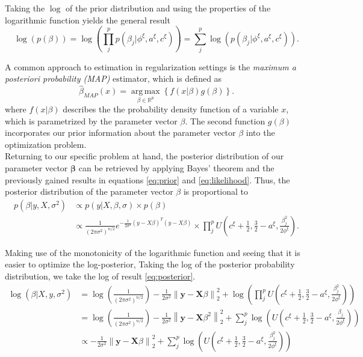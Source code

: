 \documentclass[12pt,a4paper]{article}
\newcommand{\norm}[1]{\left\lVert#1\right\rVert}
\DeclareMathOperator*{\argmax}{arg\,max}
\begin{document}
Taking the $\log$ of the prior distribution and using the properties of the logarithmic function yields the general result
\[
\log(p(\beta))=\log(\prod_j^p p(\beta_j|\phi^\xi, a^\xi, c^\xi))=\sum_j^p \log(p(\beta_j|\phi^\xi, a^\xi, c^\xi)).
\]

A common approach to estimation in regularization settings is the \textit{maximum a posteriori probability (MAP)} estimator, which is defined as
\[
\hat{\beta}_{MAP}(x) = \underset{\beta \in \mathbb{R}^p}{\argmax}\left\{f(x|\beta)g(\beta)\right\}.
\]
where $f(x|\beta)$ describes the the probability density function of a variable $x$, which is parametrized by the parameter vector $\beta$. The second function $g(\beta)$ incorporates our prior information about the parameter vector $\beta$ into the optimization problem.\\  

Returning to our specific problem at hand, the posterior distribution of our parameter vector $\mathbf{\beta}$ can be retrieved by applying Bayes' theorem and the previously gained results in equations \ref{eq:prior} and \ref{eq:likelihood}. Thus, the posterior distribution of the parameter vector $\beta$ is proportional to
\begin{align}
p(\beta|y, X, \sigma^2) 	&\propto p(y|X,\beta,\sigma)\times p(\beta) \nonumber\\
						&\propto \frac{1}{(2\pi\sigma^2)^{n/2}}e^{-\frac{1}{2\sigma^2}(y-X\beta)^T(y-X\beta)} \times \prod_j^p U\left(c^\xi + \frac{1}{2}, \frac{3}{2}-a^\xi, \frac{\beta_j^2}{2\phi^\xi}\right).\label{eq:posterior}
\end{align} 

Making use of the monotonicity of the logarithmic function and seeing that it is easier to optimize the log-posterior, Taking the log of the posterior probability distribution, we take the log of result \ref{eq:posterior}. 
\begin{align}
\log(\beta| X, y, \sigma^2) 	&= \log\left(\frac{1}{(2\pi\sigma^2)^{n/2}}\right) - \frac{1}{2\sigma^2}\norm{\mathbf{y} - \mathbf{X}\beta}_2^2 + \log\left(\prod_j^p U\left(c^\xi + \frac{1}{2}, \frac{3}{2}-a^\xi, \frac{\beta_j^2}{2\phi^\xi}\right)\right)\nonumber\\
							&= \log\left(\frac{1}{(2\pi\sigma^2)^{n/2}}\right) - \frac{1}{2\sigma^2}\norm{\mathbf{y} - \mathbf{X}\beta^2}_2^2 + \sum_j^p \log\left(U\left(c^\xi + \frac{1}{2}, \frac{3}{2}-a^\xi, \frac{\beta_j}{2\phi^\xi}\right)\right)\nonumber\\
							&\propto -\frac{1}{2\sigma^2}\norm{\mathbf{y} - \mathbf{X}\beta}_2^2 + \sum_j^p \log\left(U\left(c^\xi + \frac{1}{2}, \frac{3}{2}-a^\xi, \frac{\beta_j^2}{2\phi^\xi}\right)\right)\nonumber
\end{align}
\end{document}
